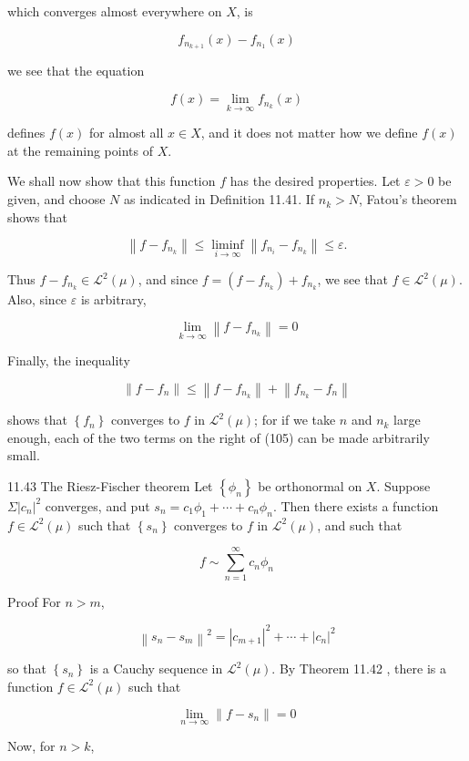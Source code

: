 \documentclass[10pt]{article}
\begin{document}
which converges almost everywhere on $X$, is

$$
f_{n_{k+1}}(x)-f_{n_{1}}(x)
$$

we see that the equation

$$
f(x)=\lim _{k \rightarrow \infty} f_{n_{k}}(x)
$$

defines $f(x)$ for almost all $x \in X$, and it does not matter how we define $f(x)$ at the remaining points of $X$.

We shall now show that this function $f$ has the desired properties. Let $\varepsilon>0$ be given, and choose $N$ as indicated in Definition 11.41. If $n_{k}>N$, Fatou's theorem shows that

$$
\left\|f-f_{n_{k}}\right\| \leq \liminf _{i \rightarrow \infty}\left\|f_{n_{i}}-f_{n_{k}}\right\| \leq \varepsilon .
$$

Thus $f-f_{n_{k}} \in \mathscr{L}^{2}(\mu)$, and since $f=\left(f-f_{n_{k}}\right)+f_{n_{k}}$, we see that $f \in \mathscr{L}^{2}(\mu)$. Also, since $\varepsilon$ is arbitrary,

$$
\lim _{k \rightarrow \infty}\left\|f-f_{n_{k}}\right\|=0
$$

Finally, the inequality

$$
\left\|f-f_{n}\right\| \leq\left\|f-f_{n_{k}}\right\|+\left\|f_{n_{k}}-f_{n}\right\|
$$

shows that $\left\{f_{n}\right\}$ converges to $f$ in $\mathscr{L}^{2}(\mu)$; for if we take $n$ and $n_{k}$ large enough, each of the two terms on the right of (105) can be made arbitrarily small.

11.43 The Riesz-Fischer theorem Let $\left\{\phi_{n}\right\}$ be orthonormal on $X$. Suppose $\Sigma\left|c_{n}\right|^{2}$ converges, and put $s_{n}=c_{1} \phi_{1}+\cdots+c_{n} \phi_{n}$. Then there exists a function $f \in \mathscr{L}^{2}(\mu)$ such that $\left\{s_{n}\right\}$ converges to $f$ in $\mathscr{L}^{2}(\mu)$, and such that

$$
f \sim \sum_{n=1}^{\infty} c_{n} \phi_{n}
$$

Proof For $n>m$,

$$
\left\|s_{n}-s_{m}\right\|^{2}=\left|c_{m+1}\right|^{2}+\cdots+\left|c_{n}\right|^{2}
$$

so that $\left\{s_{n}\right\}$ is a Cauchy sequence in $\mathscr{L}^{2}(\mu)$. By Theorem 11.42 , there is a function $f \in \mathscr{L}^{2}(\mu)$ such that

$$
\lim _{n \rightarrow \infty}\left\|f-s_{n}\right\|=0
$$

Now, for $n>k$,
\end{document}
